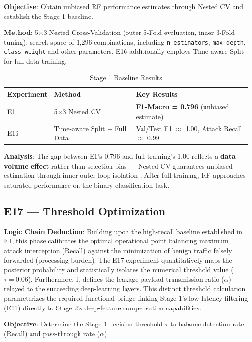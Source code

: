 \documentclass[sigconf]{acmart}
\begin{document}
\textbf{Objective}: Obtain unbiased RF performance estimates through Nested CV and establish the Stage 1 baseline.

\textbf{Method}: 5$\times$3 Nested Cross-Validation (outer 5-Fold evaluation, inner 3-Fold tuning), search space of 1,296 combinations, including \texttt{n\_estimators}, \texttt{max\_depth}, \texttt{class\_weight} and other parameters. E16 additionally employs Time-aware Split for full-data training.

\begin{table}[H]
\caption{Stage 1 Baseline Results}
\label{tab:s1_baseline}
\begin{tabular}{lll}
\toprule
\textbf{Experiment} & \textbf{Method} & \textbf{Key Results} \\
\midrule
E1 & 5$\times$3 Nested CV & \textbf{F1-Macro = 0.796} (unbiased estimate) \\
E16 & Time-aware Split + Full Data & Val/Test F1 $\approx$ 1.00, Attack Recall $\approx$ 0.99 \\
\bottomrule
\end{tabular}
\end{table}

\textbf{Analysis}: The gap between E1's 0.796 and full training's 1.00 reflects a \textbf{data volume effect} rather than selection bias --- Nested CV guarantees unbiased estimation through inner-outer loop isolation \cite{4}. After full training, RF approaches saturated performance on the binary classification task.

\subsection{E17 --- Threshold Optimization}
\textbf{Logic Chain Deduction}: Building upon the high-recall baseline established in E1, this phase calibrates the optimal operational point balancing maximum attack interception (Recall) against the minimization of benign traffic falsely forwarded (processing burden). The E17 experiment quantitatively maps the posterior probability and statistically isolates the numerical threshold value ($\tau=0.06$). Furthermore, it defines the leakage payload transmission ratio ($\alpha$) relayed to the succeeding deep-learning layers. This distinct threshold calculation parameterizes the required functional bridge linking Stage 1's low-latency filtering (E11) directly to Stage 2's deep-feature compensation capabilities.

\textbf{Objective}: Determine the Stage 1 decision threshold $\tau$ to balance detection rate (Recall) and pass-through rate ($\alpha$).
\end{document}
